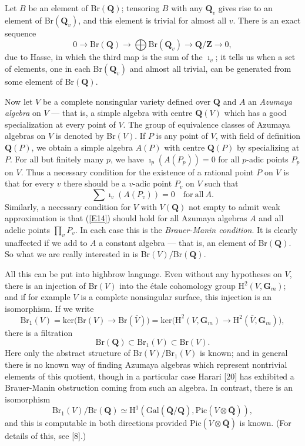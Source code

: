 \documentclass[12pt]{article}
\def\bG{{\mathbf G}}
\def\bQ{{\mathbf Q}}
\def\bZ{{\mathbf Z}}
\def\beq{\begin{equation} \label}
\begin{document}
Let $B$ be an element of Br$(\bQ)$; tensoring $B$ with any $\bQ_v$ gives rise
to an
element of Br$(\bQ_v)$, and this element is trivial for almost
all $v$. There is an exact sequence
\[ 0\rightarrow{\mathrm{Br}}(\bQ)\rightarrow\bigoplus{\mathrm{Br}}(\bQ_v)
\rightarrow\bQ/\bZ\rightarrow0, \]
due to Hasse, in which the third map is the sum of the $\imath_v$; it tells us
when a set of elements, one in each Br$(\bQ_v)$ and almost all
trivial, can be generated from some element of Br$(\bQ)$.

Now let $V$ be a complete nonsingular variety defined over $\bQ$ and $A$ an
\emph{Azumaya algebra}
on $V$ --- that is, a simple algebra with centre $\bQ(V)$ which has a good
specialization at every point of $V$. The group of equivalence classes of
Azumaya algebras on $V$ is denoted by Br$(V)$.
If $P$ is any point of $V$, with field
of definition $\bQ(P)$, we obtain a simple algebra $A(P)$ with centre $\bQ(P)$
by specializing at $P$. For all but finitely many $p$, we have $\imath_p(A(
P_p))=0$ for all $p$-adic points $P_p$ on $V$. Thus a necessary condition for
the existence of a rational point $P$ on $V$ is that for every $v$ there
should be a $v$-adic point $P_v$ on $V$ such that
\beq{E14} \sum\imath_v(A(P_v))=0 \quad {\mathrm{for~all~}} A. \end{equation}
Similarly, a necessary condition for $V$ with $V(\bQ)$ not empty to admit weak
approximation is that (\ref{E14}) should hold for all Azumaya algebras $A$ and
all adelic points $\prod_vP_v$. In each case this is the \emph{Brauer-Manin
condition}. It is clearly unaffected if we add
to $A$ a constant algebra --- that is, an element of Br$(\bQ)$. So what we are
really interested in is Br$(V)/$Br$(\bQ)$.

All this can be put into highbrow language. Even without any hypotheses on $V$,
there is an injection of Br$(V)$ into the \'{e}tale cohomology group
H$^2(V,\bG_m)$; and if for example $V$ is a complete nonsingular surface, this
injection is an isomorphism. If we write
\[ {\mathrm{Br}}_1(V)={\mathrm{ker(Br}}(V)\rightarrow{\mathrm{Br}}(\bar{V}))
={\mathrm{ker(H}}^2(V,\bG_m)\rightarrow{\mathrm{H}}^2(\bar{V},\bG_m)), \]
there is a filtration
\[ {\mathrm{Br}}(\bQ)\subset{\mathrm{Br}}_1(V)\subset{\mathrm{Br}}(V). \]
Here only the abstract structure of Br$(V)/$Br$_1(V)$ is known; and in general
there is no known way of finding Azumaya algebras which represent nontrivial
elements of this quotient, though in a particular case Harari [20] has
exhibited a Brauer-Manin obstruction coming from such an algebra. In contrast,
there is an isomorphism
\[ {\mathrm{Br}}_1(V)/{\mathrm{Br}}(\bQ)\simeq{\mathrm{H}}^1({\mathrm{Gal}}
(\bar{\bQ}/\bQ),{\mathrm{Pic}}(V\otimes\bar{\bQ})), \]
and this is computable in both directions provided Pic$(V\otimes\bar{\bQ})$
is known. (For details of this, see [8].)
\end{document}
